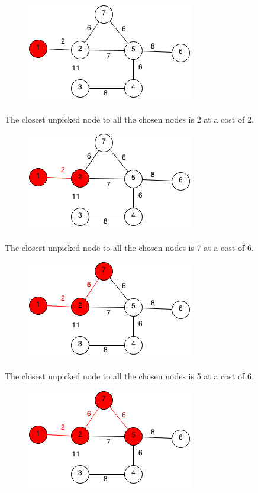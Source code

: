 \documentclass[11pt,oneside]{book}
\makeatletter
\def\maxwidth#1{\ifdim\Gin@nat@width>#1 #1\else\Gin@nat@width\fi}
\makeatother
\begin{document}
\vspace{5px}\begin{figure}[H]\centering
        \includegraphics[width=0.66\maxwidth{\textwidth}]{prim1.png}
        \end{figure}

The closest unpicked node to all the chosen nodes is 2 at a cost of 2.

\vspace{5px}\begin{figure}[H]\centering
        \includegraphics[width=0.66\maxwidth{\textwidth}]{prim2.png}
        \end{figure}

The closest unpicked node to all the chosen nodes is 7 at a cost of 6.

\vspace{5px}\begin{figure}[H]\centering
        \includegraphics[width=0.66\maxwidth{\textwidth}]{prim3.png}
        \end{figure}

The closest unpicked node to all the chosen nodes is 5 at a cost of 6.

\vspace{5px}\begin{figure}[H]\centering
        \includegraphics[width=0.66\maxwidth{\textwidth}]{prim4.png}
        \end{figure}
\end{document}
